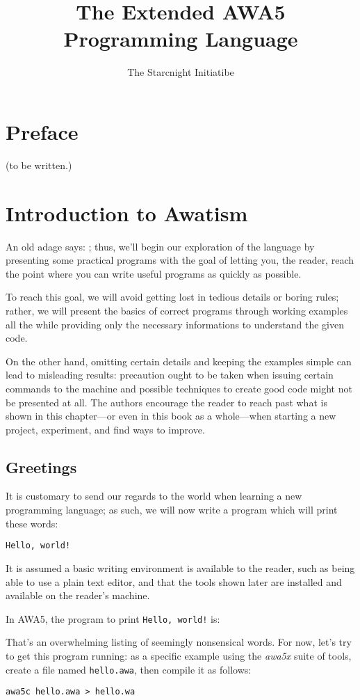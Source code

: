 \documentclass[11pt,a4paper,draft]{book}
\author{The Starcnight Initiatibe}
\title{The Extended AWA5 Programming Language}
\begin{document}
\frontmatter
\tableofcontents

\chapter{Preface}
(to be written.)

\mainmatter
\chapter{Introduction to Awatism}
An old adage says:
;
thus, we'll begin our exploration of the language by presenting some
practical programs with the goal of letting you, the reader, reach the
point where you can write useful programs as quickly as possible.

To reach this goal, we will avoid getting lost in tedious details or
boring rules; rather, we will present the basics of correct programs
through working examples all the while providing only the necessary
informations to understand the given code.

On the other hand, omitting certain details and keeping the examples
simple can lead to misleading results: precaution ought to be taken
when issuing certain commands to the machine and possible techniques
to create good code might not be presented at all. The authors
encourage the reader to reach past what is shown in this chapter---or
even in this book as a whole---when starting a new project,
experiment, and find ways to improve.

\section{Greetings}
It is customary to send our regards to the world when learning a new
programming language; as such, we will now write a program which will
print these words:
\begin{verbatim}
Hello, world!
\end{verbatim}

It is assumed a basic writing environment is available to the reader,
such as being able to use a plain text editor, and that the tools
shown later are installed and available on the reader's machine.

In AWA5, the program to print \verb|Hello, world!| is:


That's an overwhelming listing of seemingly nonsensical words. For
now, let's try to get this program running: as a specific example
using the \emph{awa5x} suite of tools, create a file named
\verb|hello.awa|, then compile it as follows:
\begin{verbatim}
awa5c hello.awa > hello.wa
\end{verbatim}
\end{document}
